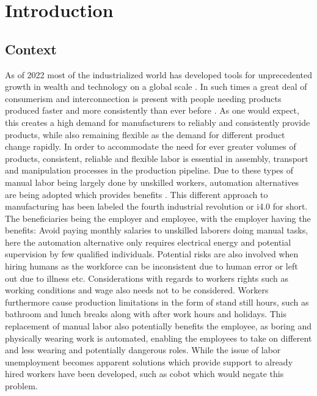 \chapter{Introduction}\label{ch:intro}

\section{Context}\label{sec:intro-context}

As of 2022 most of the industrialized world has developed tools for unprecedented growth in wealth and technology on a global scale \cite[Chapter 4]{technology-and-inequalities}. In such times a great deal of consumerism and interconnection is present with people needing products produced faster and more consistently than ever before \cite[Chapter 4]{technology-and-inequalities}. 
As one would expect, this creates a high demand for manufacturers to reliably and consistently provide products, while also remaining flexible as the demand for different product change rapidly. 
In order to accommodate the need for ever greater volumes of products, consistent, reliable and flexible labor is essential in assembly, transport and manipulation processes in the production pipeline. Due to these types of manual labor being largely done by unskilled workers, automation alternatives are being adopted which provides benefits \cite[Chapter 4]{technology-and-inequalities}. This different approach to manufacturing has been labeled the fourth industrial revolution or i4.0 for short.
The beneficiaries being the employer and employee, with the employer having the benefits: Avoid paying monthly salaries to unskilled laborers doing manual tasks, here the automation alternative only requires electrical energy and potential supervision by few qualified individuals. Potential risks are also involved when hiring humans as the workforce can be inconsistent due to human error \cite{analysis-and-control-of-human-error} or left out due to illness etc. Considerations with regards to workers rights such as working conditions and wage also needs not to be considered. Workers furthermore cause production limitations in the form of stand still hours, such as bathroom and lunch breaks along with after work hours and holidays.
This replacement of manual labor also potentially benefits the employee, as boring and physically wearing work is automated, enabling the employees to take on different and less wearing and potentially dangerous roles. While the issue of labor unemployment becomes apparent solutions which provide support to already hired workers have been developed, such as \gls{cobot}\cite*{cobots-and-the-benefits-of-their-implementation-in-intelligent-manufacturing} which would negate this problem. \medskip

